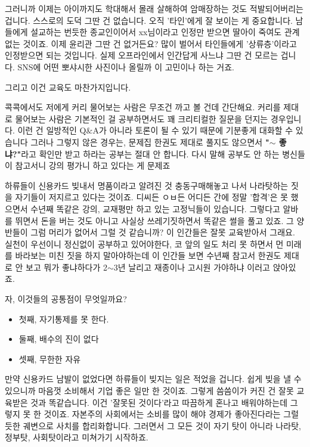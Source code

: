 그러니까 이제는 아이까지도 학대해서 몰래 살해하여 암매장하는 것도 적발되어버리는 겁니다.
스스로의 도덕 그딴 건 없습니다. 오직 '타인'에게 잘 보이는 게 중요합니다.
남들에게 설교하는 번듯한 종교인이어서 xx님이라고 인정만 받으면 딸아이 죽여도 관계없는 것이죠.
이제 윤리관 그딴 건 없거든요? 많이 벌어서 타인들에게 '상류층'이라고 인정받으면 되는 것입니다.
실제 오프라인에서 인간답게 사느냐 그딴 건 모르는 겁니다. SNS에 어떤 뽀샤시한 사진이나 올릴까 이 고민이나 하는 거죠.
\vspace{5mm}

그리고 이건 교육도 마찬가지입니다.
\vspace{5mm}

콕콕에서도 저에게 커리 물어보는 사람은 무조건 까고 볼 건데 간단해요.
커리를 제대로 물어보는 사람은 기본적인 걸 공부하면서도 꽤 크리티컬한 질문을 던지는 경우입니다.
이런 건 일방적인 Q$\&$A가 아니라 토론이 될 수 있기 때문에 기분좋게 대화할 수 있습니다
그러나 그렇지 않은 경우는, 문제집 한권도 제대로 풀지도 않으면서 \textbf{"$\sim$ 좋냐?"}라고 확인만 받고 하라는 공부는 절대 안 합니다.
다시 말해 공부도 안 하는 병신들이 참고서니 강의 평가니 하고 있다는 게 문제죠
\vspace{5mm}

하류들이 신용카드 빚내서 명품이라고 알려진 것 충동구매해놓고 나서 나라탓하는 짓을 자기들이 저지르고 있다는 것이죠.
디씨든 ㅇㅂ든 어디든 간에 정말 '합격'은 못 했으면서 수년째 똑같은 강의, 교재평만 하고 있는 고정닉들이 있습니다.
그렇다고 알바를 뛰면서 돈을 버는 것도 아니고 사실상 쓰레기짓하면서 똑같은 썰을 풀고 있죠.
그 양반들이 그럼 머리가 없어서 그럴 것 같습니까? 이 인간들은 잘못 교육받아서 그래요.
실천이 우선이니 정신없이 공부하고 있어야한다,
코 앞의 일도 처리 못 하면서 먼 미래를 바라보는 미친 짓을 하지 말아야하는데
이 인간들 보면 수년째 참고서 한권도 제대로 안 보고 뭐가 좋냐하다가 2$\sim$3년 날리고 재종이나 고시원 가야하냐 이러고 앉아있죠.
\vspace{5mm}

자, 이것들의 공통점이 무엇일까요?
\vspace{5mm}
\begin{itemize}
    \item 첫째, 자기통제를 못 한다.
    \item 둘째, 배수의 진이 없다
    \item 셋째, 무한한 자유
\end{itemize}
\vspace{5mm}

만약 신용카드 남발이 없었다면 하류들이 빚지는 일은 적었을 겁니다. 쉽게 빚을 낼 수 있으니까 마음껏 소비해서 기업 좋은 일만 한 것이죠.
그렇게 씀씀이가 커진 건 잘못 교육받은 것과 똑같습니다. 이건 '잘못된 것이다'라고 따끔하게 혼나고 배워야하는데 그렇지 못 한 것이죠.
자본주의 사회에서는 소비를 많이 해야 경제가 좋아진다라는 그럴 듯한 궤변으로 사치를 합리화합니다.
그러면서 그 모든 것이 자기 탓이 아니라 나라탓, 정부탓, 사회탓이라고 미쳐가기 시작하죠.
\vspace{5mm}

